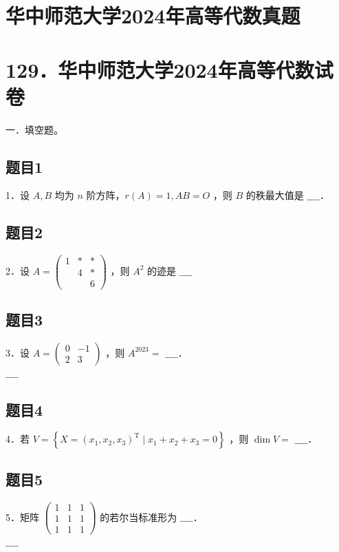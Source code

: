 \documentclass{article}
\begin{document}
\section*{华中师范大学2024年高等代数真题}
\section*{129．华中师范大学2024年高等代数试卷}
一．填空题。\\

\subsection{题目1}
1．设 \(A, B\) 均为 \(n\) 阶方阵，\(r(A)=1, A B=O\) ，则 \(B\) 的秩最大值是 \(\_\_\_\_\)．

\subsection{题目2}
2．设 \(A=\left(\begin{array}{rrr}1 & * & * \\ & 4 & * \\ & & 6\end{array}\right)\) ，则 \(A^{2}\) 的迹是 \(\_\_\_\_\)

\subsection{题目3}
3．设 \(A=\left(\begin{array}{cc}0 & -1 \\ 2 & 3\end{array}\right)\) ，则 \(A^{2023}=\) \(\_\_\_\_\)．\\
\(\_\_\_\_\)

\subsection{题目4}
4．若 \(V=\left\{X=\left(x_{1}, x_{2}, x_{3}\right)^{\mathrm{T}} \mid x_{1}+x_{2}+x_{3}=0\right\}\) ，则 \(\operatorname{dim} V=\) \(\_\_\_\_\)．

\subsection{题目5}
5．矩阵 \(\left(\begin{array}{lll}1 & 1 & 1 \\ 1 & 1 & 1 \\ 1 & 1 & 1\end{array}\right)\) 的若尔当标准形为 \(\_\_\_\_\)．\\
\(\_\_\_\_\)
\end{document}
